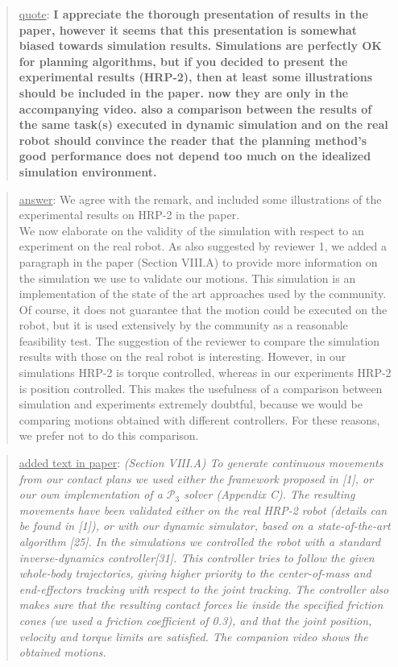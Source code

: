 \documentclass[a4paper]{article}
\newcommand{\done}[0]{}
\newcommand\quot[1]{\begin{quote} \underline{quote}: \textbf{#1}\end{quote}}
\newcommand\as[1]{\begin{quote} \underline{answer}: {#1}\end{quote} }
\newcommand\qt[1]{\begin{quote} \underline{added text in paper}: \textit{#1}\end{quote} \leavevmode \\ }
\begin{document}
\quot{I appreciate the thorough presentation of results in the paper, however
it seems that this presentation is somewhat biased towards simulation
results. Simulations are perfectly OK for planning algorithms, but if
you decided to present the experimental results (HRP-2), then at least some
illustrations should be included in the paper. now they are only in the
accompanying video.  also a comparison between the results of the same
task(s) executed in dynamic simulation and on the real robot should
convince the reader that the planning method's good performance does
not depend too much on the idealized simulation environment. }
\as{We agree with the remark, and included some illustrations of the experimental results on HRP-2 in the paper. \\
We now elaborate on the validity of the simulation with respect to an experiment on the real robot. As also suggested by reviewer 1, we added a paragraph
in the paper (Section VIII.A)  to provide more information on the simulation we use to validate our motions. This simulation is an implementation of the state of the art approaches used by the community. Of course, it does not guarantee that the motion could be executed on the robot, but it is used extensively by the community as a reasonable feasibility test. The suggestion of the reviewer to compare the simulation results with those on the real robot is interesting. However, in our simulations HRP-2 is torque controlled, whereas in our experiments HRP-2 is position controlled. This makes the usefulness of a comparison between simulation and experiments extremely doubtful, because we would be comparing motions obtained with different controllers. For these reasons, we prefer not to do this comparison.}
\qt{(Section VIII.A) To generate continuous movements from our contact plans we used either the framework proposed in [1], or our own implementation of a $\mathcal{P}_3$ solver (Appendix C).
The resulting movements have been validated either on the real HRP-2 robot (details can be found in [1]), or with our dynamic simulator, based on a state-of-the-art algorithm [25].
In the simulations we controlled the robot with a standard inverse-dynamics controller[31].
This controller tries to follow the given whole-body trajectories, giving higher priority to the center-of-mass and end-effectors tracking with respect to the joint tracking.
The controller also makes sure that the resulting contact forces lie inside the specified friction cones (we used a friction coefficient of 0.3), and that the joint position, velocity and torque limits are satisfied.
The companion video shows the obtained motions.}
\done
\end{document}
